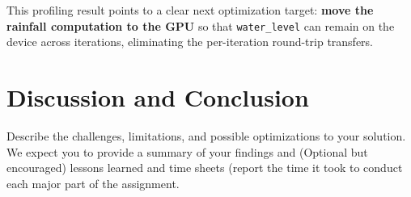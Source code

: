 \documentclass[sigconf, nonacm, review]{acmart}
\begin{document}
This profiling result points to a clear next optimization target: \textbf{move the rainfall computation to the GPU} so that \texttt{water\_level} can remain on the device across iterations, eliminating the per-iteration round-trip transfers.

\section{Discussion and Conclusion}

Describe the challenges, limitations, and possible optimizations to your solution. We expect you to provide a summary of your findings and (Optional but encouraged) lessons learned and time sheets (report the time it took to conduct each major part of the assignment.




\end{document}

